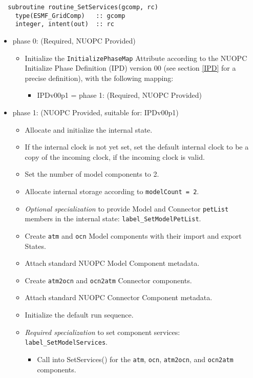\begin{verbatim}  subroutine routine_SetServices(gcomp, rc)
    type(ESMF_GridComp)   :: gcomp
    integer, intent(out)  :: rc
\end{verbatim}

\begin{itemize}
\item phase 0: ({\sc Required, NUOPC Provided})
  \begin{itemize}
  \item Initialize the {\tt InitializePhaseMap} Attribute according to the NUOPC Initialize Phase Definition (IPD) version 00 (see section \ref{IPD} for a precise definition), with the following mapping:
    \begin{itemize}
    \item IPDv00p1 = phase 1: ({\sc Required, NUOPC Provided})
    \end{itemize}  
  \end{itemize}  
\item phase 1: ({\sc NUOPC Provided}, suitable for: IPDv00p1)
  \begin{itemize}
  \item Allocate and initialize the internal state.
  \item If the internal clock is not yet set, set the default internal clock to be a copy of the incoming clock, if the incoming clock is valid.
  \item Set the number of model components to 2.
  \item Allocate internal storage according to {\tt modelCount = 2}.
  \item {\it Optional specialization} to provide Model and Connector {\tt petList} members in the internal state: {\tt label\_SetModelPetList}.
  \item Create {\tt atm} and {\tt ocn} Model components with their import and export States.
  \item Attach standard NUOPC Model Component metadata.
  \item Create {\tt atm2ocn} and {\tt ocn2atm} Connector components.
  \item Attach standard NUOPC Connector Component metadata.
  \item Initialize the default run sequence.
  \item {\it Required specialization} to set component services: {\tt label\_SetModelServices}. 
  \begin{itemize}
    \item Call into SetServices() for the {\tt atm}, {\tt ocn}, {\tt atm2ocn}, and {\tt ocn2atm} components.

\end{itemize}
\end{itemize}
\end{itemize}
